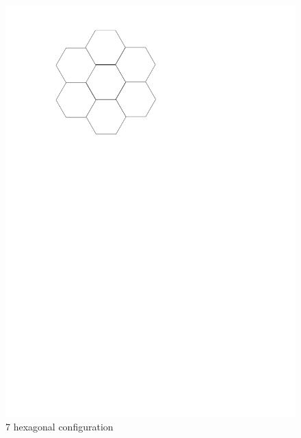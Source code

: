 

\begin{figure}[ht]
\begin{center}
\includegraphics[scale=.33]{graphics/7hexLocked.pdf}
\caption{7 hexagonal configuration}
\label{figure:7hexLockedwithHingePoints}
\end{center} 
\end{figure}
\newpage